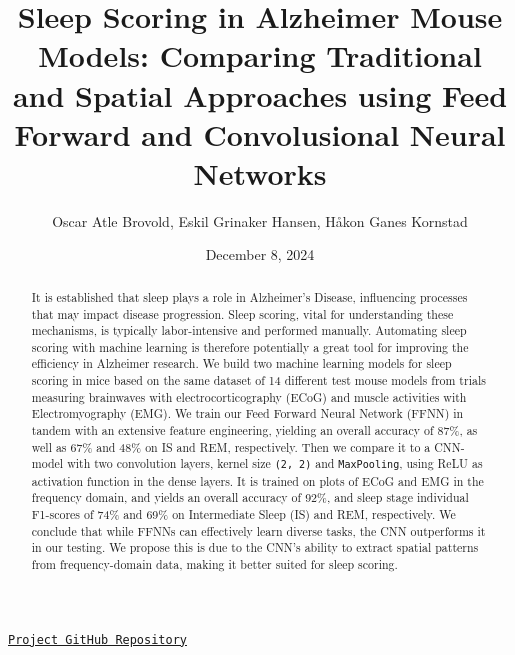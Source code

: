 \documentclass{article}
\title{Sleep Scoring in Alzheimer Mouse Models: Comparing Traditional and Spatial Approaches using Feed Forward and Convolusional Neural Networks}
\author{Oscar Atle Brovold, Eskil Grinaker Hansen, Håkon Ganes Kornstad}
\date{December 8, 2024}
\begin{document}
\maketitle
\begin{center}
    \href{https://github.com/EOH-ML/FYS-STK3155-Projects/tree/main/project3}{\texttt{Project GitHub Repository}}
\end{center}


\begin{abstract}
\noindent 
It is established that sleep plays a role in Alzheimer’s Disease, influencing processes that may impact disease progression. Sleep scoring, vital for understanding these mechanisms, is typically labor-intensive and performed manually. Automating sleep scoring with machine learning is therefore potentially a great tool for improving the efficiency in Alzheimer research. We build two machine learning models for sleep scoring in mice based on the same dataset of 14 different test mouse models from trials measuring brainwaves with electrocorticography (ECoG) and muscle activities with Electromyography (EMG). We train our Feed Forward Neural Network (FFNN) in tandem with an extensive feature engineering, yielding an overall accuracy of 87\%, as well as 67\% and 48\% on IS and REM, respectively. Then we compare it to a CNN-model with two convolution layers, kernel size \texttt{(2, 2)} and \texttt{MaxPooling}, using ReLU as activation function in the dense layers. It is trained on plots of ECoG and EMG in the frequency domain, and yields an overall accuracy of 92\%, and sleep stage individual F1-scores of 74\% and 69\% on Intermediate Sleep (IS) and REM, respectively. We conclude that while FFNNs can effectively learn diverse tasks, the CNN outperforms it in our testing. We propose this is due to the CNN's ability to extract spatial patterns from frequency-domain data, making it better suited for sleep scoring.

\end{abstract}
\end{document}
